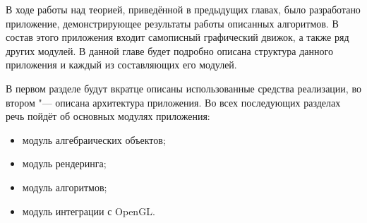 В ходе работы над теорией, приведённой в предыдущих главах, было разработано приложение, демонстрирующее результаты
работы описанных алгоритмов. В состав этого приложения входит самописный графический движок, а также ряд других модулей.
В данной главе будет подробно описана структура данного приложения и каждый из составляющих его модулей.

В первом разделе будут вкратце описаны использованные средства реализации, во втором "--- описана архитектура
приложения. Во всех последующих разделах речь пойдёт об основных модулях приложения:

\begin{itemize}

\item модуль алгебраических объектов;
\item модуль рендеринга;
\item модуль алгоритмов;
\item модуль интеграции с OpenGL.

\end{itemize}
